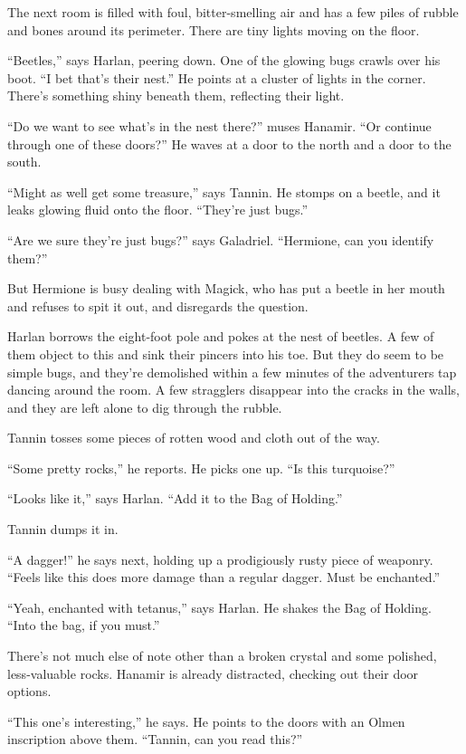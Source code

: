 \documentclass[smalldemyvopaper,11pt,twoside,onecolumn,openright,extrafontsizes]{memoir}
\begin{document}
The next room is filled with foul, bitter-smelling air and has a few
piles of rubble and bones around its perimeter. There are tiny lights
moving on the floor.

``Beetles,'' says Harlan, peering down. One of the glowing bugs crawls
over his boot. ``I bet that's their nest.'' He points at a cluster of
lights in the corner. There's something shiny beneath them, reflecting
their light.

``Do we want to see what's in the nest there?'' muses Hanamir. ``Or
continue through one of these doors?'' He waves at a door to the north
and a door to the south.

``Might as well get some treasure,'' says Tannin. He stomps on a beetle,
and it leaks glowing fluid onto the floor. ``They're just bugs.''

``Are we sure they're just bugs?'' says Galadriel. ``Hermione, can you
identify them?''

But Hermione is busy dealing with Magick, who has put a beetle in her
mouth and refuses to spit it out, and disregards the question.

Harlan borrows the eight-foot pole and pokes at the nest of beetles. A
few of them object to this and sink their pincers into his toe. But they
do seem to be simple bugs, and they're demolished within a few minutes
of the adventurers tap dancing around the room. A few stragglers
disappear into the cracks in the walls, and they are left alone to dig
through the rubble.

Tannin tosses some pieces of rotten wood and cloth out of the way.

``Some pretty rocks,'' he reports. He picks one up. ``Is this
turquoise?''

``Looks like it,'' says Harlan. ``Add it to the Bag of Holding.''

Tannin dumps it in.

``A dagger!'' he says next, holding up a prodigiously rusty piece of
weaponry. ``Feels like this does more damage than a regular dagger. Must
be enchanted.''

``Yeah, enchanted with tetanus,'' says Harlan. He shakes the Bag of
Holding. ``Into the bag, if you must.''

There's not much else of note other than a broken crystal and some
polished, less-valuable rocks. Hanamir is already distracted, checking
out their door options.

``This one's interesting,'' he says. He points to the doors with an
Olmen inscription above them. ``Tannin, can you read this?''
\end{document}
